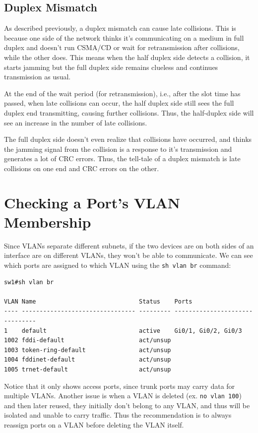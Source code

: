 \subsection{Duplex Mismatch}
As described previously, a duplex mismatch can cause late collisions. This is because one side of the network thinks it's communicating on a medium in full duplex and doesn't run CSMA/CD or wait for retransmission after collisions, while the other does.  This means when the half duplex side detects a collision, it starts jamming but the full duplex side remains clueless and continues transmission as usual. 

At the end of the wait period (for retransmission), i.e., after the slot time has passed, when late collisions can occur, the half duplex side still sees the full duplex end transmitting, causing further collisions. Thus, the half-duplex side will see an increase in the number of late collisions. 

The full duplex side doesn't even realize that collisions have occurred, and thinks the jamming signal from the collision is a response to it's transmission and generates a lot of CRC errors. Thus, the tell-tale of a duplex mismatch is late collisions on one end and CRC errors on the other.  

\section{Checking a Port's VLAN Membership}
Since VLANs separate different subnets, if the two devices are on both sides of an interface are on different VLANs, they won't be able to communicate. We can see which ports are assigned to which VLAN using the \verb|sh vlan br| command:

\vspace{-15pt}
\begin{verbatim}
sw1#sh vlan br

VLAN Name                             Status    Ports
---- -------------------------------- --------- -------------------------------
1    default                          active    Gi0/1, Gi0/2, Gi0/3
1002 fddi-default                     act/unsup
1003 token-ring-default               act/unsup
1004 fddinet-default                  act/unsup
1005 trnet-default                    act/unsup
\end{verbatim}
\vspace{-10pt}

\noindent
Notice that it only shows access ports, since trunk ports may carry data for multiple VLANs. Another issue is when a VLAN is deleted (ex. \verb|no vlan 100|) and then later reused, they initially don't belong to any VLAN, and thus will be isolated and unable to carry traffic. Thus the recommendation is to always reassign ports on a VLAN before deleting the VLAN itself. 


